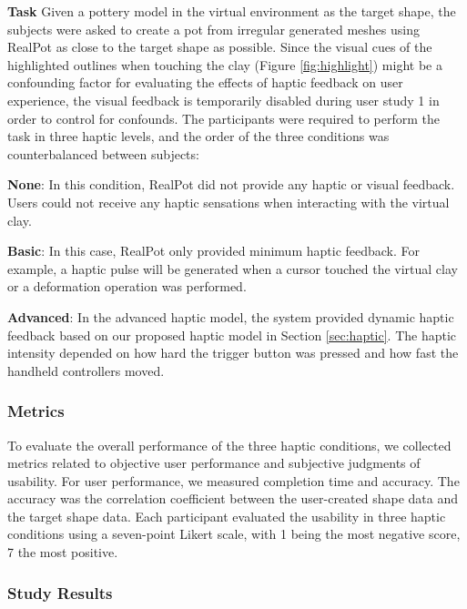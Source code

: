 \documentclass{svjour3}                     %
\begin{document}
\textbf{Task} Given a pottery model in the virtual environment as the target shape, the subjects were asked to create a pot from irregular generated meshes using RealPot as close to the target shape as possible.
{\color{blue}
Since the visual cues of the highlighted outlines when touching the clay (Figure \ref{fig:highlight}) might be a confounding factor for evaluating the effects of haptic feedback on user experience, the visual feedback is temporarily disabled during user study 1 in order to control for confounds.}
The participants were required to perform the task in three haptic levels, and the order of the three conditions was counterbalanced between subjects:

\textbf{None}: In this condition, RealPot did not provide any haptic or visual feedback. Users could not receive any haptic sensations when interacting with the virtual clay.

\textbf{Basic}: In this case, RealPot only provided minimum haptic feedback. For example, a haptic pulse will be generated when a cursor touched the virtual clay or a deformation operation was performed.

\textbf{Advanced}: In the advanced haptic model, the system provided dynamic haptic feedback based on our proposed haptic model in Section \ref{sec:haptic}. The haptic intensity depended on how hard the trigger button was pressed and how fast the handheld controllers moved.


\subsubsection{Metrics}

To evaluate the overall performance of the three haptic conditions, we collected metrics related to objective user performance and subjective judgments of usability.
%
For user performance, we measured completion time and accuracy. The accuracy was the correlation coefficient between the user-created shape data and the target shape data.
%
Each participant evaluated the usability in three haptic conditions using a seven-point Likert scale, with 1 being the most negative score, 7 the most positive.

\subsubsection{Study Results}
\end{document}
